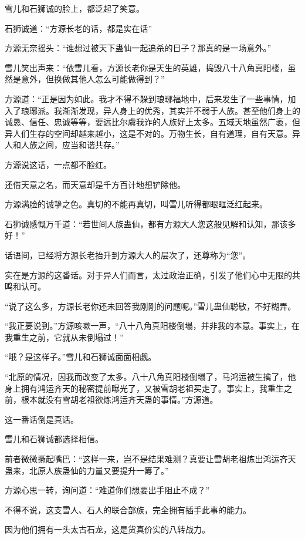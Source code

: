 \begin{this_body}
雪儿和石狮诚的脸上，都泛起了笑意。

石狮诚道：“方源长老的话，都是实在话”

方源无奈摇头：“谁想过被天下蛊仙一起追杀的日子？那真的是一场意外。”

雪儿笑出声来：“依雪儿看，方源长老你是天生的英雄，捣毁八十八角真阳楼，虽然是意外，但换做其他人怎么可能做得到？”

方源道：“正是因为如此。我才不得不躲到琅琊福地中，后来发生了一些事情，加入了琅琊派。我渐渐发现，异人身上的优秀，其实并不弱于人族。甚至他们身上的诚恳、信任、忠诚等等，要远比尔虞我诈的人族好上太多。五域天地虽然广袤，但异人们生存的空间却越来越小，这是不对的。万物生长，自有道理，自有天意。异人和人族之间，应当和谐共存。”

方源说这话，一点都不脸红。

还借天意之名，而天意却是千方百计地想铲除他。

方源满脸的诚挚之色。真切的不能再真切，叫雪儿听得都眼眶泛红起来。

石狮诚感慨万千道：“若世间人族蛊仙，都有方源大人您这般见解和认知，那该多好！”

话语间，已经将方源长老抬升到方源大人的层次了，还尊称为“您”。

实在是方源的这番话。对于异人们而言，太过政治正确，引发了他们心中无限的共鸣和认可。

“说了这么多，方源长老你还未回答我刚刚的问题呢。”雪儿蛊仙聪敏，不好糊弄。

“我正要说到。”方源咳嗽一声，“八十八角真阳楼倒塌，并非我的本意。事实上，在我重生之前，它就从未倒塌过！”

“哦？是这样子。”雪儿和石狮诚面面相觑。

“北原的情况，因我而改变了太多。八十八角真阳楼倒塌了，马鸿运被生擒了，他身上拥有鸿运齐天的秘密提前曝光了，又被雪胡老祖买走了。事实上，我重生之前，根本就没有雪胡老祖欲炼鸿运齐天蛊的事情。”方源道。

这一番话倒是真话。

雪儿和石狮诚都选择相信。

前者微微撅起嘴巴：“这样一来，岂不是结果难测？真要让雪胡老祖炼出鸿运齐天蛊来，北原人族蛊仙的力量又要提升一筹了。”

方源心思一转，询问道：“难道你们想要出手阻止不成？”

不得不说，这支雪人、石人的联合部族，完全拥有插手此事的能力。

因为他们拥有一头太古石龙，这是货真价实的八转战力。


\end{this_body}
